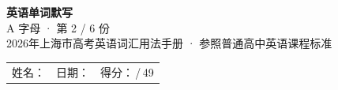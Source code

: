 \documentclass[10pt,a4paper]{article}
\begin{document}
\pagestyle{plain}

\begin{center}
{\LARGE\bfseries 英语单词默写}\\[0.22em]
{\large A 字母 · 第 2 / 6 份}\\[0.18em]
{\small 2026年上海市高考英语词汇用法手册 · 参照普通高中英语课程标准}
\end{center}

\vspace{0.25em}
\noindent\begin{tabular}{@{}p{}@{}p{}@{}p{}@{}}
姓名：\underline{\hspace{2.0cm}} & 日期：\underline{\hspace{2.0cm}} & 得分：\underline{\hspace{1.3cm}}\,/\,49 \\
\end{tabular}

\vspace{0.3em}

\vspace{0.08em}
\end{document}
